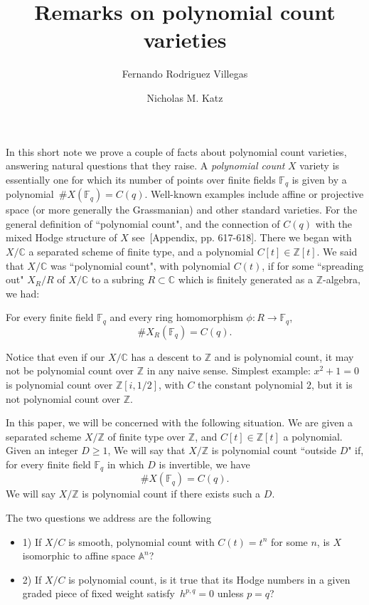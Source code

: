 \documentclass[12pt]{article}
\newcommand{\Z}{{\mathbb Z}}
\newcommand{\F}{{\mathbb F}}
\newcommand{\C}{{\mathbb C}}
\newcommand{\A}{\mathbb A}
\begin{document}
\title{Remarks on polynomial count varieties}

\author{Fernando Rodriguez Villegas}
\author{Nicholas M. Katz}


\maketitle
\section{}
In this short note we prove a couple of facts about polynomial count
varieties, answering natural questions that they raise. A {\it
  polynomial count} $X$ variety is essentially one for which its
number of points over finite fields $\F_q$ is given by a
polynomial~$\#X(\F_q)=C(q)$. Well-known examples include affine or
projective space (or more generally the Grassmanian) and other
standard varieties. For the general definition of ``polynomial count", and the connection of
$C(q)$ with the mixed Hodge structure of $X$ see~\cite{HRV}[Appendix, pp. 617-618].
There we began with $X/\C$ a separated scheme of finite type, and a polynomial $C[t] \in \Z[t]$.
We said that $X/\C$ was  ``polynomial count", with polynomial $C(t)$, if
 for some ``spreading out" $X_R/R$ of $X/\C$ to  a subring $R \subset \C$ which is finitely
generated as a $\Z$-algebra, we had:

For every finite field $\F_q$ and every ring homomorphism  $\phi: R \rightarrow \F_q$,
$$\#X_R(\F_q)=C(q).$$

Notice that even if our $X/\C$ has a descent to $\Z$ and is polynomial count, it may not
be polynomial count over $\Z$ in any naive sense. Simplest example: $x^2+1=0$ is polynomial
count over $\Z[i,1/2]$, with $C$ the constant polynomial $2$, but it is not polynomial
count over $\Z$.


In this paper, we will be concerned with the following situation. 
We are given a separated scheme $X/\Z$  of finite type over $\Z$, and $C[t] \in \Z[t]$ a polynomial.
Given an integer $D \ge 1$, 
We will say that $X/\Z$ is polynomial count ``outside $D$" if, for every finite field $\F_q$ in which $D$ is invertible, we have
$$\#X(\F_q)=C(q).$$
We will say $X/\Z$ is polynomial count if there exists such a $D$.




The two questions we address are the following
\begin{itemize}
\item
 1) If $X/C$ is smooth, polynomial count with $C(t)=t^n$ for some
  $n$, is $X$ isomorphic to affine space $\A^n$?
\item 2) If $X/C$ is polynomial count, is it true that its Hodge
  numbers in a given graded piece of fixed weight satisfy~$h^{p,q}=0$
  unless $p=q$?
\end{itemize}
\end{document}
